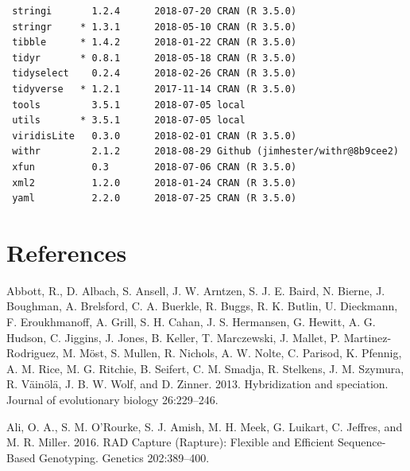 \documentclass[twoside,12pt,final]{ucthesis-CA2012} %
\begin{document}
\begin{ucmainmatter}
\begin{verbatim}
 stringi       1.2.4      2018-07-20 CRAN (R 3.5.0)                       
 stringr     * 1.3.1      2018-05-10 CRAN (R 3.5.0)                       
 tibble      * 1.4.2      2018-01-22 CRAN (R 3.5.0)                       
 tidyr       * 0.8.1      2018-05-18 CRAN (R 3.5.0)                       
 tidyselect    0.2.4      2018-02-26 CRAN (R 3.5.0)                       
 tidyverse   * 1.2.1      2017-11-14 CRAN (R 3.5.0)                       
 tools         3.5.1      2018-07-05 local                                
 utils       * 3.5.1      2018-07-05 local                                
 viridisLite   0.3.0      2018-02-01 CRAN (R 3.5.0)                       
 withr         2.1.2      2018-08-29 Github (jimhester/withr@8b9cee2)     
 xfun          0.3        2018-07-06 CRAN (R 3.5.0)                       
 xml2          1.2.0      2018-01-24 CRAN (R 3.5.0)                       
 yaml          2.2.0      2018-07-25 CRAN (R 3.5.0)                       
\end{verbatim}
\backmatter

\hypertarget{references}{%
\chapter*{References}\label{references}}


\noindent

\setlength{\parindent}{-0.20in}
\setlength{\leftskip}{0.20in}
\setlength{\parskip}{8pt}

\hypertarget{refs}{}
\leavevmode\hypertarget{ref-abbott_hybridization_2013}{}%
Abbott, R., D. Albach, S. Ansell, J. W. Arntzen, S. J. E. Baird, N.
Bierne, J. Boughman, A. Brelsford, C. A. Buerkle, R. Buggs, R. K.
Butlin, U. Dieckmann, F. Eroukhmanoff, A. Grill, S. H. Cahan, J. S.
Hermansen, G. Hewitt, A. G. Hudson, C. Jiggins, J. Jones, B. Keller, T.
Marczewski, J. Mallet, P. Martinez-Rodriguez, M. Möst, S. Mullen, R.
Nichols, A. W. Nolte, C. Parisod, K. Pfennig, A. M. Rice, M. G. Ritchie,
B. Seifert, C. M. Smadja, R. Stelkens, J. M. Szymura, R. Väinölä, J. B.
W. Wolf, and D. Zinner. 2013. Hybridization and speciation. Journal of
evolutionary biology 26:229--246.

\leavevmode\hypertarget{ref-ali_rad_2016}{}%
Ali, O. A., S. M. O'Rourke, S. J. Amish, M. H. Meek, G. Luikart, C.
Jeffres, and M. R. Miller. 2016. RAD Capture (Rapture): Flexible and
Efficient Sequence-Based Genotyping. Genetics 202:389--400.


\end{ucmainmatter}
\end{document}
